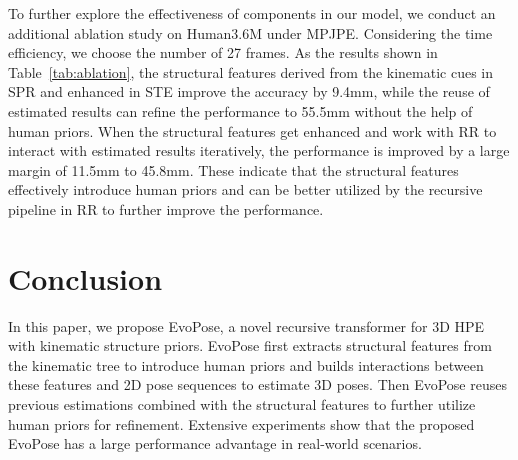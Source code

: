 \documentclass{article}
\begin{document}
To further explore the effectiveness of components in our model, we conduct an additional ablation study on Human3.6M under MPJPE. Considering the time efficiency, we choose the number of 27 frames. As the results shown in Table~\ref{tab:ablation}, the structural features derived from the kinematic cues in SPR and enhanced in STE improve the accuracy by 9.4mm, while the reuse of estimated results can refine the performance to 55.5mm without the help of human priors. When the structural features get enhanced and work with RR to interact with estimated results iteratively, the performance is improved by a large margin of 11.5mm to 45.8mm. These indicate that the structural features effectively introduce human priors and can be better utilized by the recursive pipeline in RR to further improve the performance.







\section{Conclusion}\label{sec:conclusion}
In this paper, we propose EvoPose, a novel recursive transformer for 3D HPE with kinematic structure priors. EvoPose first extracts structural features from the kinematic tree to introduce human priors and builds interactions between these features and 2D pose sequences to estimate 3D poses. Then EvoPose reuses previous estimations combined with the structural features to further utilize human priors for refinement. Extensive experiments show that the proposed EvoPose has a large performance advantage in real-world scenarios.




\end{document}
